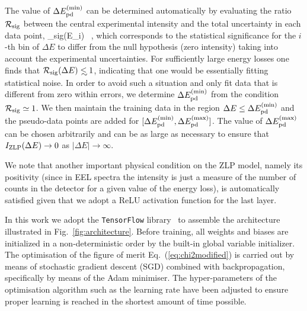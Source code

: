 The value of $\Delta E_{\rm pd}^{\rm (min)}$
can be determined automatically by evaluating the ratio $\mathcal{R}_{\rm sig}$ between the central
experimental intensity and the total uncertainty in each data point,
\be
\label{eq:pdlocation}
_{\rm sig}(\Delta E_i)\equiv {} \, ,
\ee
which corresponds to the statistical significance for the $i$-th bin of $\Delta E$ to differ from the null hypothesis
(zero intensity) taking into account the experimental uncertainties.
%
For sufficiently large energy losses one finds that $\mathcal{R}_{\rm sig}(\Delta E)\lsim 1$,
indicating that one would be essentially fitting statistical noise.
%
In order to avoid such a situation and only fit data that is different from zero within errors, we
determine $\Delta E_{\rm pd}^{\rm (min)}$ from the condition $\mathcal{R}_{\rm sig}\simeq 1$.
%
We then maintain the training data in the region $\Delta E \le \Delta E_{\rm pd}^{\rm (min)}$ and the pseudo-data
points are added for $[ \Delta E_{\rm pd}^{\rm (min)}, \Delta E_{\rm pd}^{\rm (max)}]$. 
%
The value of $\Delta E_{\rm pd}^{\rm (max)}$ can be chosen arbitrarily and can be as large as necessary
to ensure that $I_{\rm ZLP}(\Delta E)\to 0$ as $|\Delta E| \to \infty$.

We note that another important physical condition on the ZLP model, namely its positivity
(since in EEL spectra the intensity is just a measure of the number of counts in the
detector for a given value of the energy loss), is automatically satisfied given that
we adopt a ReLU activation function for the last layer.

In this work we adopt the {\tt TensorFlow} library~\cite{Abadi:2016kic} to assemble
the architecture illustrated in  Fig.~\ref{fig:architecture}.
%
Before training, all weights and biases are initialized in a non-deterministic order
by the built-in global variable initializer. 
%
The optimisation of the figure of merit Eq.~(\ref{eq:chi2modified}) is carried
out by means of stochastic gradient descent (SGD) combined with backpropagation, specifically
by means of the Adam minimiser.
%
The hyper-parameters of the optimisation algorithm such as the learning rate
have been adjusted to ensure proper learning is reached in the shortest amount
of time possible.

